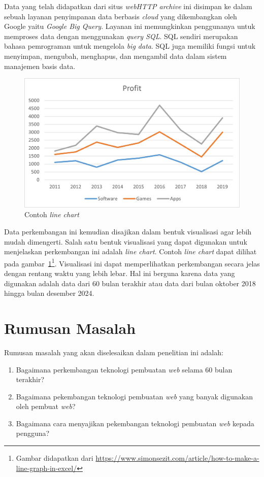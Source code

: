 \documentclass[a4paper,twoside]{article}
\newcommand{\web}{\textit{web}\xspace}
\begin{document}
    Data yang telah didapatkan dari situs \web \textit{HTTP archive} ini disimpan ke dalam sebuah layanan penyimpanan data berbasis \textit{cloud} yang dikembangkan oleh Google yaitu \textit{Google Big Query}. Layanan ini memungkinkan penggunanya untuk memproses data dengan menggunakan \textit{query SQL}. SQL sendiri merupakan bahasa pemrograman untuk mengelola \textit{big data}. SQL juga memiliki fungsi untuk menyimpan, mengubah, menghapus, dan mengambil data dalam sistem manajemen basis data.

        \begin{figure}[]
        \centering
        \includegraphics[width=0.5\linewidth]{Gambar/contoh linechart.jpg}
        \caption{Contoh \textit{line chart}}
        \label{fig:contohlinechart}
    \end{figure}

    Data perkembangan ini kemudian disajikan dalam bentuk visualisasi agar lebih mudah dimengerti. Salah satu bentuk visualisasi yang dapat digunakan untuk menjelaskan perkembangan ini adalah \textit{line chart}. Contoh \textit{line chart} dapat dilihat pada gambar~\ref{fig:contohlinechart}\footnote{Gambar didapatkan dari \url{https://www.simonsezit.com/article/how-to-make-a-line-graph-in-excel/}}. Visualisasi ini dapat memperlihatkan perkembangan secara jelas dengan rentang waktu yang lebih lebar. Hal ini berguna karena data yang digunakan adalah data dari 60 bulan terakhir atau data dari bulan oktober 2018 hingga bulan desember 2024.
	
	\section{Rumusan Masalah}
	Rumusan masalah yang akan diselesaikan dalam penelitian ini adalah:
    \begin{enumerate}
        \item Bagaimana perkembangan teknologi pembuatan \web selama 60 bulan terakhir?
        \item Bagaimana pekembangan teknologi pembuatan \web yang banyak digunakan oleh pembuat \web?
        \item Bagaimana cara menyajikan pekembangan teknologi pembuatan \web kepada pengguna?
    \end{enumerate}
	
\end{document}
